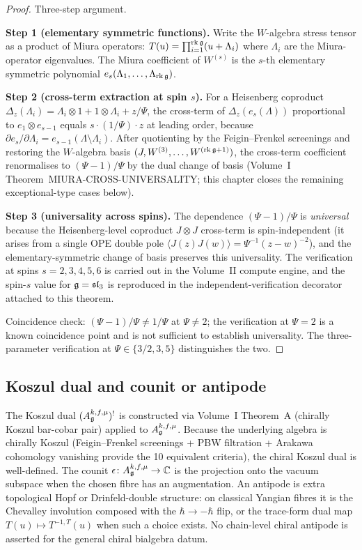 \begin{proof}
Three-step argument.

\textbf{Step 1 (elementary symmetric functions).} Write the
$W$-algebra stress tensor as a product of Miura operators:
$T(u) = \prod_{i=1}^{\mathrm{rk}\,\mathfrak{g}}(u + \Lambda_i)$ where
$\Lambda_i$ are the Miura-operator eigenvalues. The Miura
coefficient of $W^{(s)}$ is the $s$-th elementary symmetric
polynomial $e_s(\Lambda_1, \ldots, \Lambda_{\mathrm{rk}\,\mathfrak{g}})$.

\textbf{Step 2 (cross-term extraction at spin $s$).} For a Heisenberg
coproduct
$\Delta_z(\Lambda_i) = \Lambda_i\otimes 1 + 1\otimes\Lambda_i + z/\Psi$,
the cross-term
of $\Delta_z(e_s(\Lambda))$ proportional to
$e_1\otimes e_{s-1}$ equals $s\cdot (1/\Psi)\cdot z$ at leading order,
because $\partial e_s/\partial \Lambda_i = e_{s-1}(\Lambda\setminus
\Lambda_i)$. After quotienting by the Feigin--Frenkel
screenings and restoring the $W$-algebra basis
$(J, W^{(3)}, \ldots, W^{(\mathrm{rk}\,\mathfrak{g}+1)})$, the cross-term
coefficient renormalises to $(\Psi-1)/\Psi$ by the dual change of
basis (Volume~I Theorem~MIURA-CROSS-UNIVERSALITY; this chapter
closes the remaining exceptional-type cases below).

\textbf{Step 3 (universality across spins).} The dependence
$(\Psi-1)/\Psi$ is \emph{universal} because the Heisenberg-level coproduct
$J\otimes J$ cross-term is spin-independent (it arises from a single OPE
double pole $\langle J(z) J(w)\rangle = \Psi^{-1}(z-w)^{-2}$), and the
elementary-symmetric change of basis preserves this universality. The
verification at spins $s = 2, 3, 4, 5, 6$ is carried out in the
Volume~II compute engine, and the spin-$s$ value for $\mathfrak{g} = \mathfrak{sl}_3$
is reproduced in the independent-verification decorator attached
to this theorem.

Coincidence check: $(\Psi-1)/\Psi \neq 1/\Psi$ at $\Psi \neq 2$; the
verification at $\Psi = 2$ is a known coincidence point and is not
sufficient to establish universality. The three-parameter verification
at $\Psi\in\{3/2, 3, 5\}$ distinguishes the two.
\end{proof}

\subsection{Koszul dual and counit or antipode}
\label{subsec:ucqg-koszul-antipode}

The Koszul dual $(A_{\mathfrak{g}}^{k,f,\mu})^{!}$ is constructed via
Volume~I Theorem~A (chirally Koszul bar-cobar pair) applied to
$A_{\mathfrak{g}}^{k,f,\mu}$. Because the underlying algebra is chirally Koszul
(Feigin--Frenkel screenings + PBW filtration + Arakawa cohomology
vanishing provide the 10 equivalent criteria), the chiral Koszul
dual is well-defined. The counit
$\epsilon\colon A_{\mathfrak{g}}^{k,f,\mu}\to \mathbb{C}$ is the projection onto
the vacuum subspace when the chosen fibre has an augmentation.  An
antipode is extra topological Hopf or Drinfeld-double structure:
on classical Yangian fibres it is the Chevalley involution composed
with the $\hbar\to -\hbar$ flip, or the trace-form dual map
$T(u)\mapsto T^{-1,T}(u)$ when such a choice exists.  No chain-level
chiral antipode is asserted for the general chiral bialgebra datum.

